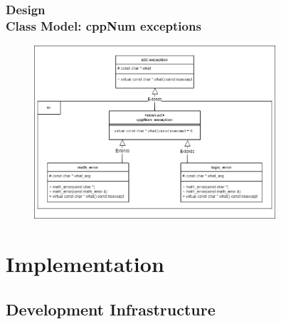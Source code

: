 \documentclass[ucs,10pt]{beamer}
\begin{document}
\begin{frame}
\frametitle{Design \\
	\small \color{rwth-blue} Class Model: cppNum exceptions}
	\begin{figure}
                \centering
                \includegraphics[width=0.8\textwidth]{figures/class_diagramm.png}
        \end{figure}
\end{frame}


\section{Implementation}

\subsection{Development Infrastructure}
\end{document}
